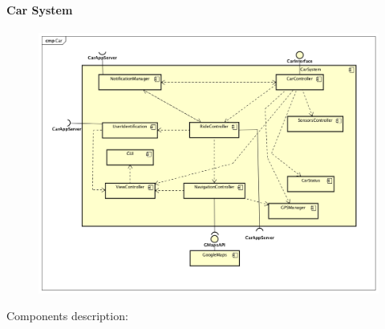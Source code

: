 \documentclass[]{article}
\let\oldparagraph\paragraph
\renewcommand{\paragraph}[1]{\oldparagraph{#1}\mbox{}}
\begin{document}
\paragraph{Car System}\label{car-system}

\begin{figure}[htbp]
\centering
\includegraphics[width=1.00000\textwidth,height=1.00000\textwidth]{./comp_diagrams/CarSystem.png}
\caption{}\label{id}
\end{figure}

Components description:
\end{document}
